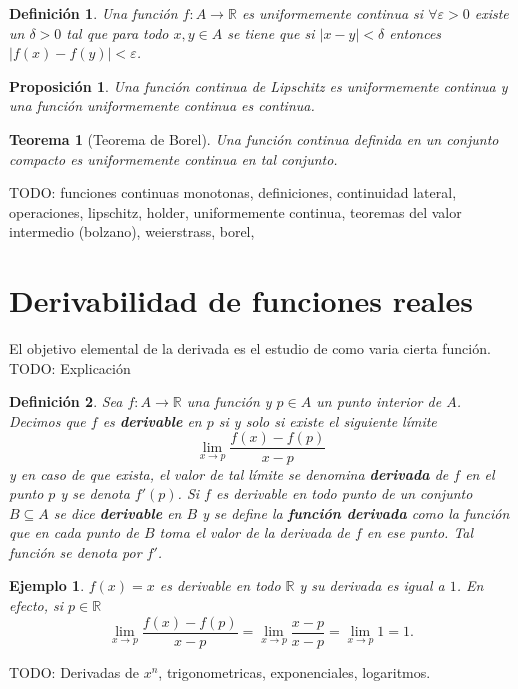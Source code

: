 \documentclass{article}
\newtheorem{theorem}{Teorema}
\newtheorem{prop}{Proposición}
\newtheorem{define}{Definición}
\newtheorem{ejem}{Ejemplo}
\newcommand{\reales}{\mathbb{R}}
\begin{document}
\begin{define}
	Una función $f: A \rightarrow \reales$ es uniformemente continua si $\forall \varepsilon > 0$ existe un $\delta > 0$ tal que para todo $x,y \in A$ se tiene que si $|x-y| < \delta$ entonces $|f(x) - f(y)| < \varepsilon$.
\end{define}

\begin{prop}
	Una función continua de Lipschitz es uniformemente continua y una función uniformemente continua es continua.
\end{prop}

\begin{theorem}[Teorema de Borel]
	Una función continua definida en un conjunto compacto es uniformemente continua en tal conjunto.
\end{theorem}

TODO: funciones continuas monotonas, definiciones, continuidad lateral, operaciones, lipschitz, holder, uniformemente continua, teoremas del valor intermedio (bolzano), weierstrass, borel, 








\newpage
\section{Derivabilidad de funciones reales}
El objetivo elemental de la derivada es el estudio de como varia cierta función. TODO: Explicación 

\begin{define}
	Sea $f: A \rightarrow \reales$ una función y $p \in A$ un punto interior de $A$. Decimos que $f$ es \textbf{derivable} en $p$ si y solo si existe el siguiente límite
	\begin{equation*}
		\lim_{x \rightarrow p} \frac{f(x) - f(p)}{x - p}
	\end{equation*}
	y en caso de que exista, el valor de tal límite se denomina \textbf{derivada} de $f$ en el punto $p$ y se denota $f'(p)$. Si $f$ es derivable en todo punto de un conjunto $B \subseteq A$ se dice \textbf{derivable} en $B$ y se define la \textbf{función derivada} como la función que en cada punto de $B$ toma el valor de la derivada de $f$ en ese punto. Tal función se denota por $f'$. 
\end{define}

\begin{ejem}
	$f(x) = x$ es derivable en todo $\reales$ y su derivada es igual a $1$. En efecto, si $p \in \reales$
	\begin{equation*}
		\lim_{x \rightarrow p} \frac{f(x) - f(p)}{x - p} = \lim_{x \rightarrow p} \frac{x - p}{x - p} = \lim_{x \rightarrow p} 1 = 1.
	\end{equation*}
\end{ejem}
TODO: Derivadas de $x^n$, trigonometricas, exponenciales, logaritmos. 
\end{document}
